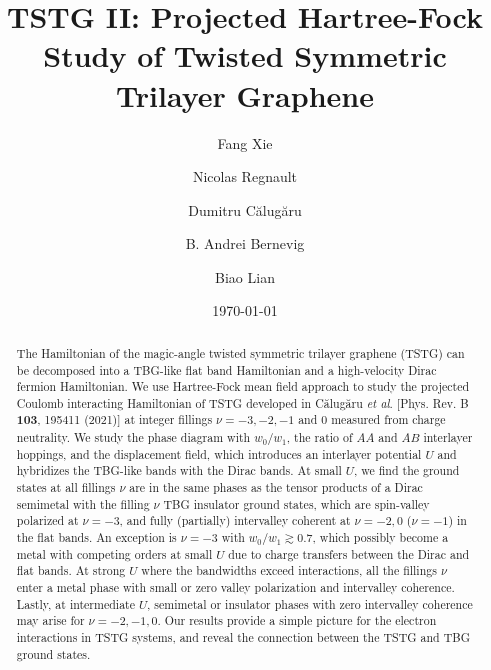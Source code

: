 \documentclass[prb,aps,nofootinbib,amssymb,twocolumn,superscriptaddress,10pt]{revtex4-2}
\begin{document}

\newcommand{\vk}{\mathbf{k}}
\newcommand{\vp}{\mathbf{p}}
\newcommand{\vq}{\mathbf{q}}

\newcommand{\hc}{\hat{c}}
\newcommand{\hb}{\hat{b}}
\newcommand{\hd}{\hat{d}}
\newcommand{\ha}{\hat{a}}
\newcommand{\hf}{\hat{f}}

\title{TSTG II: Projected Hartree-Fock Study of Twisted Symmetric Trilayer Graphene}

\author{Fang Xie}
\author{Nicolas Regnault}
\author{Dumitru C\u{a}lug\u{a}ru}
\author{B. Andrei Bernevig}
\author{Biao Lian}

\date{\today}

\begin{abstract}
The Hamiltonian of the magic-angle twisted symmetric trilayer graphene (TSTG) can be decomposed into a TBG-like flat band Hamiltonian and a high-velocity Dirac fermion Hamiltonian. 
We use Hartree-Fock mean field approach to study the projected Coulomb interacting Hamiltonian of TSTG developed in C\u{a}lug\u{a}ru \emph{et al}. [Phys. Rev. B {\bf 103}, 195411 (2021)] at integer fillings $\nu=-3, -2, -1$ and $0$ measured from charge neutrality. We study the phase diagram with $w_0/w_1$, the ratio of $AA$ and $AB$ interlayer hoppings, and the displacement field, which introduces an interlayer potential $U$ and hybridizes the TBG-like bands with the Dirac bands. 
At small $U$, we find the ground states at all fillings $\nu$ are in the same phases as the tensor products of a Dirac semimetal with the filling $\nu$ TBG insulator ground states, which are spin-valley polarized at $\nu=-3$, and fully (partially) intervalley coherent at $\nu=-2,0$ ($\nu=-1$) in the flat bands. An exception is $\nu=-3$ with $w_0/w_1 \gtrsim 0.7$, which possibly become a metal with competing orders at small $U$ due to charge transfers between the Dirac and flat bands.
At strong $U$ where the bandwidths exceed interactions, all the fillings $\nu$ enter a metal phase with small or zero valley polarization and intervalley coherence. Lastly, at intermediate $U$, semimetal or insulator phases with zero intervalley coherence may arise for $\nu=-2,-1,0$. 
Our results provide a simple picture for the electron interactions in TSTG systems, and reveal the connection between the TSTG and TBG ground states.
\end{abstract}
\end{document}
